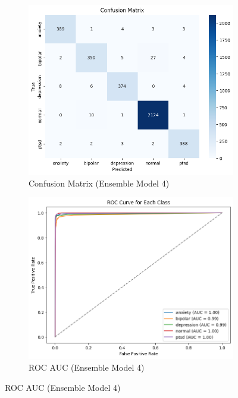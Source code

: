 \pagebreak

\begin{figure}[h!]
    \centering
    \begin{subfigure}[b]{0.48\textwidth}
        \centering
        \includegraphics[width=\textwidth]{Images/BAG CM.png}
        \caption*{Confusion Matrix (Ensemble Model 4)}
        \label{bag cm}  %
    \end{subfigure}
    \hfill
    \begin{subfigure}[b]{0.48\textwidth}
        \centering
        \includegraphics[width=\textwidth]{Images/BAG ROC.png}
        \caption*{ROC AUC (Ensemble Model 4)}
        \label{bag roc}  %
    \end{subfigure}
    \label{fig:ensemble_model4_comparison}
\end{figure}


